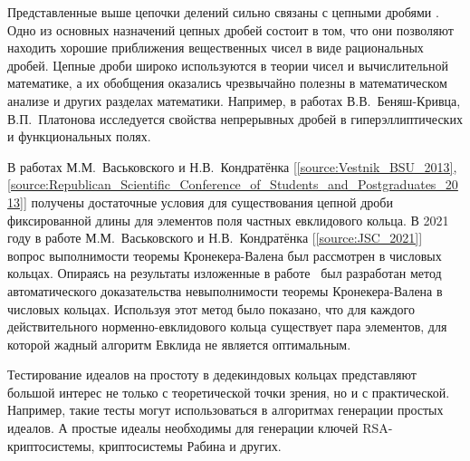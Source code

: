 \documentclass[_00_dissertation.tex]{subfiles}
\begin{document}
Представленные выше цепочки делений сильно связаны с цепными дробями \cite{source:Vinogradov}.
Одно из основных назначений цепных дробей состоит в том, что они позволяют находить хорошие приближения вещественных чисел в виде рациональных дробей.
Цепные дроби широко используются в теории чисел и вычислительной математике, а их обобщения оказались чрезвычайно полезны в математическом анализе и других разделах математики.
Например, в работах В.В.~Беняш-Кривца, В.П.~Платонова \cite{source:Benyash-Krivets_1, source:Benyash-Krivets_2} исследуется свойства непрерывных дробей в гиперэллиптических и функциональных полях.

В работах М.М.~Васьковского и Н.В.~Кондратёнка [\ref{source:Vestnik_BSU_2013}, \ref{source:Republican_Scientific_Conference_of_Students_and_Postgraduates_2013}] получены достаточные условия для существования цепной дроби фиксированной длины для элементов поля частных евклидового кольца.
В 2021 году в работе М.М.~Васьковского и Н.В.~Кондратёнка [\ref{source:JSC_2021}] вопрос выполнимости теоремы Кронекера-Валена был рассмотрен в числовых кольцах.
Опираясь на результаты изложенные в работе~\cite{source:Cerri, source:Lezowski} был разработан метод автоматического доказательства невыполнимости теоремы Кронекера-Валена в числовых кольцах.
Используя этот метод было показано, что для каждого действительного норменно-евклидового кольца существует пара элементов, для которой жадный алгоритм Евклида не является оптимальным.


Тестирование идеалов на простоту в дедекиндовых кольцах представляют большой интерес не только с теоретической точки зрения, но и с практической.
Например, такие тесты могут использоваться в алгоритмах генерации простых идеалов.
А простые идеалы необходимы для генерации ключей RSA-криптосистемы, криптосистемы Рабина и других.
\end{document}
